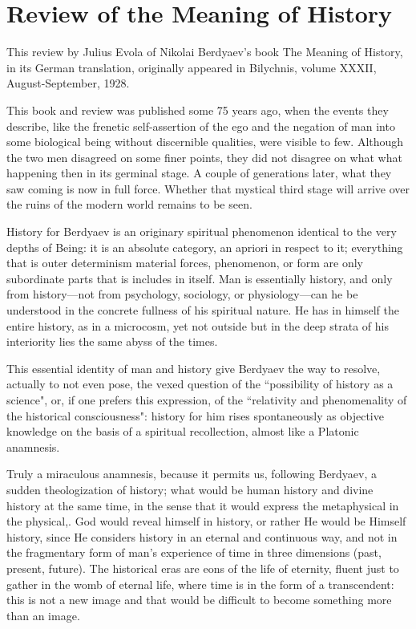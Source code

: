 \section{Review of the Meaning of History}

\begin{quotex}
This review by Julius Evola of Nikolai Berdyaev's book The Meaning of History, in its German translation, originally appeared in Bilychnis, volume XXXII, August-September, 1928.

This book and review was published some 75 years ago, when the events they describe, like the frenetic self-assertion of the ego and the negation of man into some biological being without discernible qualities, were visible to few. Although the two men disagreed on some finer points, they did not disagree on what what happening then in its germinal stage. A couple of generations later, what they saw coming is now in full force. Whether that mystical third stage will arrive over the ruins of the modern world remains to be seen. 
\end{quotex}

History for Berdyaev is an originary spiritual phenomenon identical to the very depths of Being: it is an absolute category, an apriori in respect to it; everything that is outer determinism material forces, phenomenon, or form are only subordinate parts that is includes in itself. Man is essentially history, and only from history—not from psychology, sociology, or physiology—can he be understood in the concrete fullness of his spiritual nature. He has in himself the entire history, as in a microcosm, yet not outside but in the deep strata of his interiority lies the same abyss of the times.

This essential identity of man and history give Berdyaev the way to resolve, actually to not even pose, the vexed question of the ``possibility of history as a science", or, if one prefers this expression, of the ``relativity and phenomenality of the historical consciousness": history for him rises spontaneously as objective knowledge on the basis of a spiritual recollection, almost like a Platonic anamnesis.

Truly a miraculous anamnesis, because it permits us, following Berdyaev, a sudden theologization of history; what would be human history and divine history at the same time, in the sense that it would express the metaphysical in the physical,. God would reveal himself in history, or rather He would be Himself history, since He considers history in an eternal and continuous way, and not in the fragmentary form of man's experience of time in three dimensions (past, present, future). The historical eras are eons of the life of eternity, fluent just to gather in the womb of eternal life, where time is in the form of a transcendent: this is not a new image and that would be difficult to become something more than an image.

